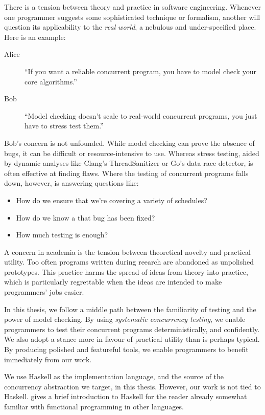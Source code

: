 There is a tension between theory and practice in software
engineering.  Whenever one programmer suggests some sophisticated
technique or formalism, another will question its applicability to the
\emph{real world}, a nebulous and under-specified place.  Here is an
example:

\begin{description}
\item[Alice] ``If you want a reliable concurrent program, you have to
  model check your core algorithms.''
\item[Bob] ``Model checking doesn't scale to real-world concurrent
  programs, you just have to stress test them.''
\end{description}

Bob's concern is not unfounded.  While model checking can prove the
absence of bugs, it can be difficult or resource-intensive to use.
Whereas stress testing, aided by dynamic analyses like Clang's
ThreadSanitizer\cite{serebryany2009} or Go's data race
detector\cite{golang2017}, is often effective at finding flaws.  Where
the testing of concurrent programs falls down, however, is answering
questions like:

\begin{itemize}
\item How do we ensure that we're covering a variety of schedules?
\item How do we know a that bug has been fixed?
\item How much testing is enough?
\end{itemize}

A concern in academia is the tension between theoretical novelty and
practical utility.  Too often programs written during reearch are
abandoned as unpolished prototypes.  This practice harms the spread of
ideas from theory into practice, which is particularly regrettable
when the ideas are intended to make programmers' jobs easier.

In this thesis, we follow a middle path between the familiarity of
testing and the power of model checking.  By using \emph{systematic
  concurrency testing}, we enable programmers to test their concurrent
programs deterministically, and confidently.  We also adopt a stance
more in favour of practical utility than is perhaps typical.  By
producing polished and featureful tools, we enable programmers to
benefit immediately from our work.

We use Haskell as the implementation language, and the source of the
concurrency abstraction we target, in this thesis.  However, our work
is not tied to Haskell.   gives a brief introduction
to Haskell for the reader already somewhat familiar with functional
programming in other languages.

